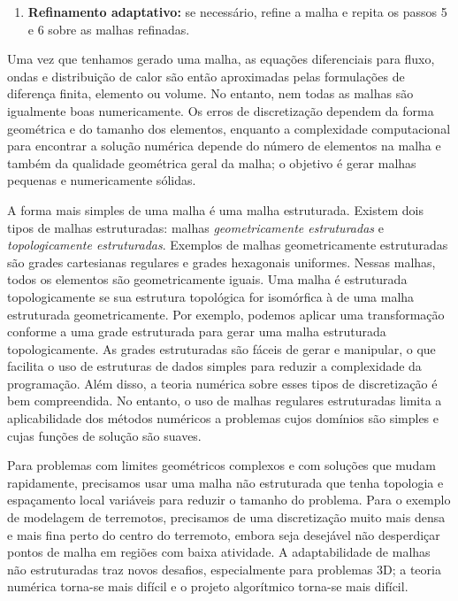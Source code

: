 \documentclass[a4paper, 12 pt]{article} %
\begin{document}
\begin{itemize}
\begin{enumerate}
		\item \textbf{Refinamento adaptativo:} se necessário, refine a malha e repita os passos 5 e 6 sobre as malhas refinadas.
	\end{enumerate}
	
	\hspace{0.5cm} Uma vez que tenhamos gerado uma malha, as equações diferenciais para fluxo, ondas e distribuição de calor são então aproximadas pelas formulações de diferença finita, elemento ou volume. No entanto, nem todas as malhas são igualmente boas numericamente. Os erros de discretização dependem da forma geométrica e do tamanho dos elementos, enquanto a complexidade computacional para encontrar a solução numérica depende do número de elementos na malha e também da qualidade geométrica geral da malha; o objetivo é gerar malhas pequenas e numericamente sólidas.
	
	\hspace{0.5cm} A forma mais simples de uma malha é uma malha estruturada. Existem dois tipos de malhas estruturadas: malhas \textit{geometricamente estruturadas} e \textit{topologicamente estruturadas}. Exemplos de malhas geometricamente estruturadas são grades cartesianas regulares e grades hexagonais uniformes. Nessas malhas, todos os elementos são geometricamente iguais. Uma malha é estruturada topologicamente se sua estrutura topológica for isomórfica à de uma malha estruturada geometricamente. Por exemplo, podemos aplicar uma transformação conforme a uma grade estruturada para gerar uma malha estruturada topologicamente. As grades estruturadas são fáceis de gerar e manipular, o que facilita o uso de estruturas de dados simples para reduzir a complexidade da programação. Além disso, a teoria numérica sobre esses tipos de discretização é bem compreendida. No entanto, o uso de malhas regulares estruturadas limita a aplicabilidade dos métodos numéricos a problemas cujos domínios são simples e cujas funções de solução são suaves.
	
	\hspace{0.5cm} Para problemas com limites geométricos complexos e com soluções que mudam rapidamente, precisamos usar uma malha não estruturada que tenha topologia e espaçamento local variáveis para reduzir o tamanho do problema. Para o exemplo de modelagem de terremotos, precisamos de uma discretização muito mais densa e mais fina perto do centro do terremoto, embora seja desejável não desperdiçar pontos de malha em regiões com baixa atividade. A adaptabilidade de malhas não estruturadas traz novos desafios, especialmente para problemas 3D; a teoria numérica torna-se mais difícil e o projeto algorítmico torna-se mais difícil.
\end{itemize}
\end{document}
